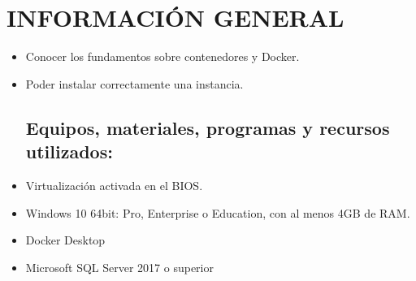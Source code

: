 \section{INFORMACIÓN GENERAL} 

\begin{itemize}
\subsection{Objetivos:}
	\item Conocer los fundamentos sobre contenedores y Docker.
	\item Poder instalar correctamente una instancia.
\subsection{Equipos, materiales, programas y recursos utilizados:}
	\item Virtualización activada en el BIOS.
	\item Windows 10 64bit: Pro, Enterprise o Education, con al menos 4GB de RAM.
	\item Docker Desktop
	\item Microsoft SQL Server 2017 o superior

\end{itemize}
